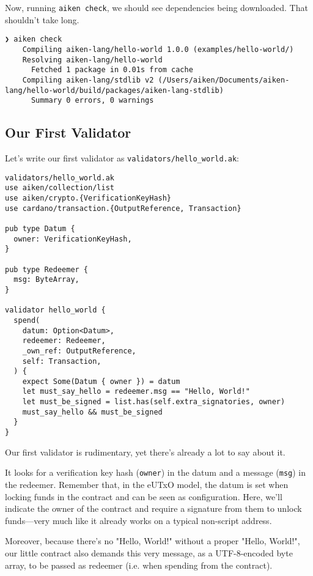 Now, running \texttt{aiken check}, we should see dependencies being downloaded. That shouldn't take long.

\begin{verbatim}
❯ aiken check
    Compiling aiken-lang/hello-world 1.0.0 (examples/hello-world/)
    Resolving aiken-lang/hello-world
      Fetched 1 package in 0.01s from cache
    Compiling aiken-lang/stdlib v2 (/Users/aiken/Documents/aiken-lang/hello-world/build/packages/aiken-lang-stdlib)
      Summary 0 errors, 0 warnings
\end{verbatim}

\subsection{Our First Validator}
Let's write our first validator as \texttt{validators/hello\_world.ak}:

\begin{verbatim}
validators/hello_world.ak
use aiken/collection/list
use aiken/crypto.{VerificationKeyHash}
use cardano/transaction.{OutputReference, Transaction}
 
pub type Datum {
  owner: VerificationKeyHash,
}
 
pub type Redeemer {
  msg: ByteArray,
}
 
validator hello_world {
  spend(
    datum: Option<Datum>,
    redeemer: Redeemer,
    _own_ref: OutputReference,
    self: Transaction,
  ) {
    expect Some(Datum { owner }) = datum
    let must_say_hello = redeemer.msg == "Hello, World!"
    let must_be_signed = list.has(self.extra_signatories, owner)
    must_say_hello && must_be_signed
  }
}
\end{verbatim}

Our first validator is rudimentary, yet there's already a lot to say about it.

It looks for a verification key hash (\texttt{owner}) in the datum and a message (\texttt{msg}) in the redeemer. Remember that, in the eUTxO model, the datum is set when locking funds in the contract and can be seen as configuration. Here, we'll indicate the owner of the contract and require a signature from them to unlock funds—very much like it already works on a typical non-script address.

Moreover, because there's no "Hello, World!" without a proper "Hello, World!", our little contract also demands this very message, as a UTF-8-encoded byte array, to be passed as redeemer (i.e. when spending from the contract).

